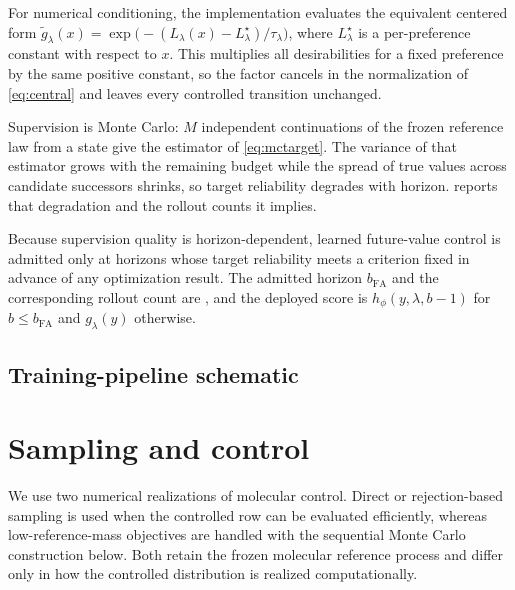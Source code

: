 For numerical conditioning, the implementation evaluates the equivalent centered form $\widetilde g_\lambda(x)=\exp\bigl(-(L_\lambda(x)-L^{\star}_\lambda)/\tau_\lambda\bigr)$, where $L^{\star}_\lambda$ is a per-preference constant with respect to $x$. This multiplies all desirabilities for a fixed preference by the same positive constant, so the factor cancels in the normalization of \eqref{eq:central} and leaves every controlled transition unchanged.

Supervision is Monte Carlo: $M$ independent continuations of the frozen reference law from a state give the estimator of \eqref{eq:mctarget}. The variance of that estimator grows with the remaining budget while the spread of true values across candidate successors shrinks, so target reliability degrades with horizon.  reports that degradation and the rollout counts it implies.

Because supervision quality is horizon-dependent, learned future-value control is admitted only at horizons whose target reliability meets a criterion fixed in advance of any optimization result. The admitted horizon $b_{\mathrm{FA}}$ and the corresponding rollout count are \XXX{}, and the deployed score is $h_\phi(y,\lambda,b-1)$ for $b\le b_{\mathrm{FA}}$ and $g_\lambda(y)$ otherwise.

\subsection{Training-pipeline schematic}



\section{Sampling and control}
\label{app:sampling}

We use two numerical realizations of molecular control. Direct or rejection-based sampling is used when the controlled row can be evaluated efficiently, whereas low-reference-mass objectives are handled with the sequential Monte Carlo construction below. Both retain the frozen molecular reference process and differ only in how the controlled distribution is realized computationally.

